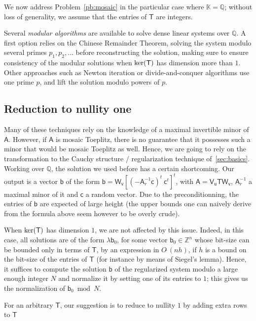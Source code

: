 \documentclass{sig-alternate}
\newcommand{\vb}{\ensuremath{\mathsf{b}}}
\newcommand{\vc}{\ensuremath{\mathsf{c}}}
\newcommand{\vu}{\ensuremath{\mathsf{u}}}
\newcommand{\vv}{\ensuremath{\mathsf{v}}}
\newcommand{\mA}{\ensuremath{\mathsf{A}}}
\newcommand{\mT}{\ensuremath{\mathsf{T}}}
\newcommand{\mV}{\ensuremath{\mathsf{V}}}
\newcommand{\mW}{\ensuremath{\mathsf{W}}}
\newcommand{\K}{\ensuremath{\mathbb{K}}}
\newcommand{\Q}{\ensuremath{\mathbb{Q}}}
\newcommand{\Z}{\ensuremath{\mathbb{Z}}}
\newcommand{\Otilde}[1]{\ensuremath{O\tilde{~}(#1)}} %
\begin{document}
We now address Problem~\ref{pb:mosaic} in the particular case where
$\K=\Q$; without loss of generality, we assume that the entries of
$\mT$ are integers.

Several {\em modular algorithms} are available to solve dense linear
systems over $\Q$. A first option relies on the Chinese Remainder
Theorem, solving the system modulo several primes $p_1,p_2,\dots$
before reconstructing the solution, making sure to ensure consistency
of the modular solutions when ${\rm ker}(\mT)$ has dimension more than
$1$. Other approaches such as Newton iteration or divide-and-conquer
algorithms use one prime $p$, and lift the solution modulo powers of $p$.


\subsection{Reduction to nullity one}

Many of these techniques rely on the knowledge of a maximal invertible
minor of $\mA$. However, if $\mA$ is mosaic Toeplitz, there is no
guarantee that it possesses such a minor that would be mosaic Toeplitz
as well. Hence, we are going to rely on the transformation to the
Cauchy structure / regularization technique of~\ref{sec:basics}.
Working over $\Q$, the solution we used before has a certain
shortcoming. Our output is a vector $\vb$ of the form
$\vb=\mW_{\vv}[(-\mA_r^{-1}\vc)^t ~ \vc^t]^t$, with $\mA=\mV_\vu \mT
\mW_{\vv}$, $\mA_r^{-1}$ a maximal minor of it and $\vc$ a random
vector. Due to the preconditionning, the entries of $\vb$ are expected
of large height (the upper bounds one can naively derive from the
formula above seem however to be overly crude).

When ${\rm ker}(\mT)$ has dimension $1$, we are not affected by this
issue. Indeed, in this case, all solutions are of the form $\lambda
\vb_0$, for some vector $\vb_0 \in \Z^n$ whose bit-size can be bounded
only in terms of $\mT$, by an expression in $\Otilde{n h}$, if $h$ is
a bound on the bit-size of the entries of $\mT$ (for instance by means 
of Siegel's lemma). Hence, it suffices to compute the solution $\vb$ 
of the regularized system modulo a large enough integer $N$
and normalize it by setting one of its entries to $1$;
this gives us the normalization of $\vb_0 \bmod N$.

For an arbitrary $\mT$, our suggestion is to reduce to 
nullity $1$ by adding extra rows to $\mT$
\end{document}
